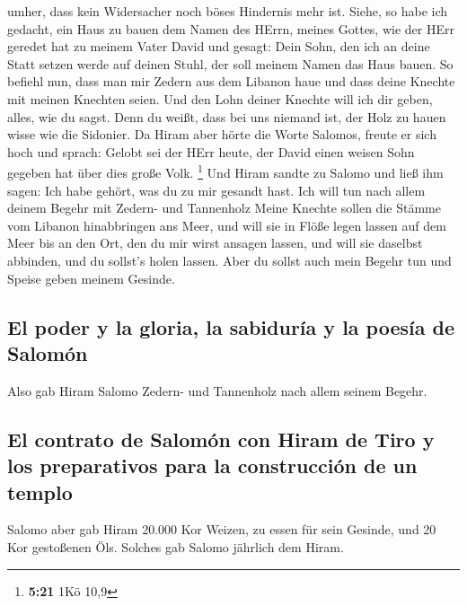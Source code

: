 umher, dass kein Widersacher noch böses Hindernis mehr ist.
 Siehe, so habe ich gedacht, ein Haus zu bauen dem Namen
des HErrn, meines Gottes, wie der HErr geredet hat zu meinem Vater David
und gesagt: Dein Sohn, den ich an deine Statt setzen werde auf deinen
Stuhl, der soll meinem Namen das Haus bauen.  So befiehl
nun, dass man mir Zedern aus dem Libanon haue und dass deine Knechte mit
meinen Knechten seien. Und den Lohn deiner Knechte will ich dir geben,
alles, wie du sagst. Denn du weißt, dass bei uns niemand ist, der Holz
zu hauen wisse wie die Sidonier.  Da Hiram aber hörte die
Worte Salomos, freute er sich hoch und sprach: Gelobt sei der HErr
heute, der David einen weisen Sohn gegeben hat über dies große Volk.
\footnote{\textbf{5:21} 1Kö 10,9}  Und Hiram sandte zu
Salomo und ließ ihm sagen: Ich habe gehört, was du zu mir gesandt hast.
Ich will tun nach allem deinem Begehr mit Zedern- und Tannenholz
 Meine Knechte sollen die Stämme vom Libanon hinabbringen
ans Meer, und will sie in Flöße legen lassen auf dem Meer bis an den
Ort, den du mir wirst ansagen lassen, und will sie daselbst abbinden,
und du sollst's holen lassen. Aber du sollst auch mein Begehr tun und
Speise geben meinem Gesinde.

\hypertarget{el-poder-y-la-gloria-la-sabiduruxeda-y-la-poesuxeda-de-salomuxf3n}{%
\subsection{El poder y la gloria, la sabiduría y la poesía de
Salomón}\label{el-poder-y-la-gloria-la-sabiduruxeda-y-la-poesuxeda-de-salomuxf3n}}

 Also gab Hiram Salomo Zedern- und Tannenholz nach allem
seinem Begehr.

\hypertarget{el-contrato-de-salomuxf3n-con-hiram-de-tiro-y-los-preparativos-para-la-construcciuxf3n-de-un-templo}{%
\subsection{El contrato de Salomón con Hiram de Tiro y los preparativos
para la construcción de un
templo}\label{el-contrato-de-salomuxf3n-con-hiram-de-tiro-y-los-preparativos-para-la-construcciuxf3n-de-un-templo}}

 Salomo aber gab Hiram 20.000 Kor Weizen, zu essen für
sein Gesinde, und 20 Kor gestoßenen Öls. Solches gab Salomo jährlich dem
Hiram.

